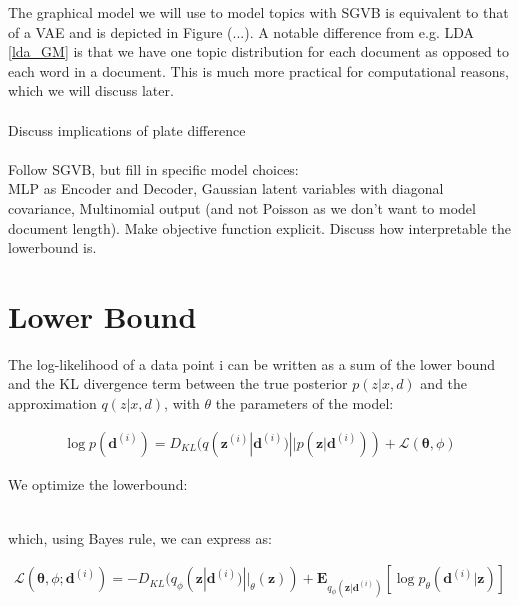\documentclass{article}
\begin{document}
	The graphical model we will use to model topics with SGVB is  equivalent to that of a VAE and is depicted in Figure (...). A notable difference from e.g. LDA \ref{lda_GM} is that we have one topic distribution for each document as opposed to each word in a document. This is much more practical for computational reasons, which we will discuss later. \\ \\
	
	Discuss implications of plate difference \\ \\
	
	Follow SGVB, but fill in specific model choices:  \\ 
	MLP as Encoder and Decoder, Gaussian latent variables with diagonal covariance, Multinomial output (and not Poisson as we don't want to model document length). Make objective function explicit. Discuss how interpretable the lowerbound is. 
	
	\section{Lower Bound}
	
	The log-likelihood of a data point i can be written as a sum of the lower bound and the KL divergence term between the true posterior $p(z|x,d)$ and the approximation $q(z|x,d)$, with $\theta$ the parameters of the model:
	
	\begin{align*}
	\log p(\mathbf{d}^{(i)}) = D_{KL}(q(\mathbf{z}^{(i)}|\mathbf{d}^{(i)}) || p(\mathbf{z}|\mathbf{d}^{(i)})) + \mathcal{L}(\mathbf{\theta}, \phi)
	\end{align*}
	
	We optimize the lowerbound: 
	
	\begin{align}
	\end{align}
	
	which, using Bayes rule, we can express as:
	
	\begin{align}
	\mathcal{L}(\mathbf{\theta}, \phi; \mathbf{d}^{(i)}) = -D_{KL}(q_\phi (\mathbf{z}| \mathbf{d}^{(i)})||_\theta (\mathbf{z})) + \mathbf{E}_{q_\phi(\mathbf{z}|\mathbf{d}^{(i)})}[\log p_\theta (\mathbf{d}^{(i)}|\mathbf{z})]
	\end{align}
	
\end{document}
